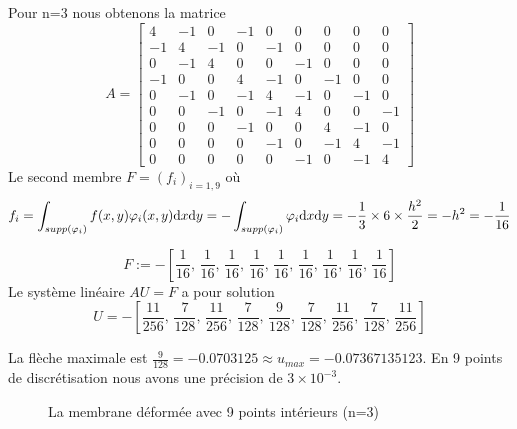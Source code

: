 \documentclass{article}
\def \de {{\rm d}}
\begin{document}
Pour n=3 nous obtenons la matrice
\[
 A=\left[ 
{\begin{array}{rrrrrrrrr}
4 & -1 & 0 & -1 & 0 & 0 & 0 & 0 & 0 \\
-1 & 4 & -1 & 0 & -1 & 0 & 0 & 0 & 0 \\
0 & -1 & 4 & 0 & 0 & -1 & 0 & 0 & 0 \\
-1 & 0 & 0 & 4 & -1 & 0 & -1 & 0 & 0 \\
0 & -1 & 0 & -1 & 4 & -1 & 0 & -1 & 0 \\
0 & 0 & -1 & 0 & -1 & 4 & 0 & 0 & -1 \\
0 & 0 & 0 & -1 & 0 & 0 & 4 & -1 & 0 \\
0 & 0 & 0 & 0 & -1 & 0 & -1 & 4 & -1 \\
0 & 0 & 0 & 0 & 0 & -1 & 0 & -1 & 4
\end{array}}
 \right] 
\]
Le second membre $F=(f_i)_{i=1,9}$ où 
\[f_i=\int_{supp(\varphi_i)}f(x,y)\varphi_i(x,y)\de x\de y=-\int_{supp(\varphi_i)}\varphi_i\de x\de y=-\frac{1}{3}\times 6\times\frac{h^2}{2}=-h^2=-\frac{1}{16}\]

\[
F := -\left[{\displaystyle \frac {1}{16}} , \,{\displaystyle \frac {1}{
16}} , \,{\displaystyle \frac {1}{16}} , \,{\displaystyle \frac {
1}{16}} , \,{\displaystyle \frac {1}{16}} , \,{\displaystyle 
\frac {1}{16}} , \,{\displaystyle \frac {1}{16}} , \,
{\displaystyle \frac {1}{16}} , \,{\displaystyle \frac {1}{16}} \right]
\]
Le système linéaire $AU=F$ a pour solution
\[
 U=-\left[  \! {\displaystyle \frac {11}{256}} , \,{\displaystyle 
\frac {7}{128}} , \,{\displaystyle \frac {11}{256}} , \,
{\displaystyle \frac {7}{128}} , \,{\displaystyle \frac {9}{128}
} , \,{\displaystyle \frac {7}{128}} , \,{\displaystyle \frac {11
}{256}} , \,{\displaystyle \frac {7}{128}} , \,{\displaystyle 
\frac {11}{256}}  \!  \right] 
\]

La flèche maximale est $\frac{9}{128} = -0.0703125\approx u_{max}=-0.07367135123$. En 9 points de discrétisation nous avons une précision de $3\times 10^{-3}$.

\begin{figure}[!h] %
 
\centering
 
 
 
\caption{La membrane déformée avec 9 points intérieurs (n=3)}
 
\label{membraneDéformée}
 
\end{figure}
\end{document}
